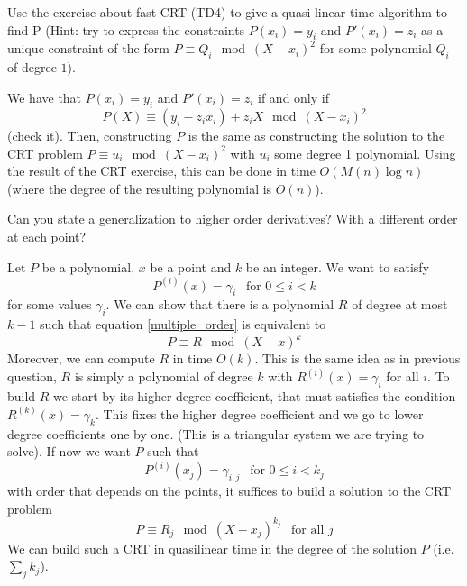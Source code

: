 \documentclass[11pt]{exam}
\theoremstyle{definition}
\begin{document}
\begin{questions}
\question Use the exercise about fast CRT (TD4) %
  to give a quasi-linear time 
  algorithm to find P (Hint: try to express the constraints $P(x_i) =y_i$ and $P'(x_i) = z_i$ as a unique constraint of the form $P \equiv Q_i \mod (X-x_i)^2$ for some polynomial $Q_i$ of degree $1$).
  
  \begin{solution}
  We have that $P(x_i) = y_i$ and $P'(x_i) = z_i$ if and only if
  $$ P(X) \equiv (y_i-z_ix_i) + z_iX \mod (X-x_i)^2$$
  (check it).
  Then, constructing $P$ is the same as constructing the solution to the CRT problem $P \equiv u_i \mod (X-x_i)^2$ with $u_i$ some degree 1 polynomial. Using the result of the CRT exercise, this can be done in time $O(M(n) \log n)$ (where the degree of the resulting polynomial is $O(n)$).
  \end{solution}

\question Can you state a generalization to higher order
  derivatives? With a different order at each point? 
  
  \begin{solution}
  Let $P$ be a polynomial, $x$ be a point and $k$ be an integer. We want to satisfy
  \begin{equation}
  \label{multiple_order}
  P^{(i)}(x) = \gamma_i \ \  \text{ for $0 \leq i < k$}
  \end{equation}
  for some values $\gamma_i$. We can show that there is a polynomial $R$ of degree at most $k-1$ such that equation \ref{multiple_order} is equivalent to 
  \begin{equation}
  P \equiv R \mod (X-x)^k
  \end{equation}
  Moreover, we can compute $R$ in time $O(k)$. This is the same idea as in previous question, $R$ is simply a polynomial of degree $k$ with $R^{(i)}(x) = \gamma_i$ for all $i$. To build $R$ we start by its higher degree coefficient, that must satisfies the condition $R^{(k)}(x) = \gamma_k$. This fixes the higher degree coefficient and we go to lower degree coefficients one by one. (This is a triangular system we are trying to solve).
  If now we want $P$ such that 
  \begin{equation*}
  P^{(i)}(x_j) = \gamma_{i,j} \ \  \text{ for $0 \leq i < k_j$}
  \end{equation*}
  with order that depends on the points, it suffices to build a solution to the CRT problem
  \begin{equation*}
  P \equiv R_j \mod (X-x_j)^{k_j} \ \ \text{ for all $j$}
  \end{equation*}
  We can build such a CRT in quasilinear time in the degree of the solution $P$ (i.e. $\sum_j k_j$).
  

\end{solution}
\end{questions}
\end{document}

